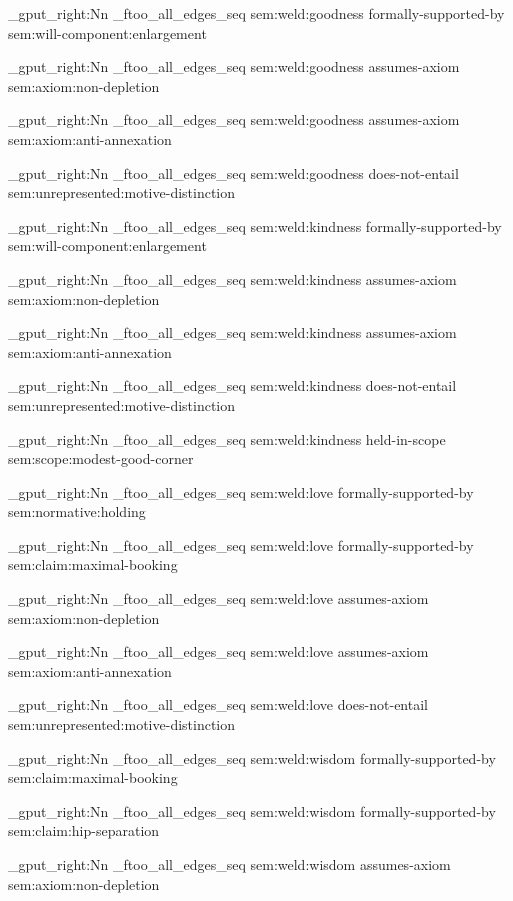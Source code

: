 \seq_gput_right:Nn \g_ftoo_all_edges_seq { { sem:weld:goodness } { formally-supported-by } { sem:will-component:enlargement } }

\seq_gput_right:Nn \g_ftoo_all_edges_seq { { sem:weld:goodness } { assumes-axiom } { sem:axiom:non-depletion } }

\seq_gput_right:Nn \g_ftoo_all_edges_seq { { sem:weld:goodness } { assumes-axiom } { sem:axiom:anti-annexation } }

\seq_gput_right:Nn \g_ftoo_all_edges_seq { { sem:weld:goodness } { does-not-entail } { sem:unrepresented:motive-distinction } }

\seq_gput_right:Nn \g_ftoo_all_edges_seq { { sem:weld:kindness } { formally-supported-by } { sem:will-component:enlargement } }

\seq_gput_right:Nn \g_ftoo_all_edges_seq { { sem:weld:kindness } { assumes-axiom } { sem:axiom:non-depletion } }

\seq_gput_right:Nn \g_ftoo_all_edges_seq { { sem:weld:kindness } { assumes-axiom } { sem:axiom:anti-annexation } }

\seq_gput_right:Nn \g_ftoo_all_edges_seq { { sem:weld:kindness } { does-not-entail } { sem:unrepresented:motive-distinction } }

\seq_gput_right:Nn \g_ftoo_all_edges_seq { { sem:weld:kindness } { held-in-scope } { sem:scope:modest-good-corner } }

\seq_gput_right:Nn \g_ftoo_all_edges_seq { { sem:weld:love } { formally-supported-by } { sem:normative:holding } }

\seq_gput_right:Nn \g_ftoo_all_edges_seq { { sem:weld:love } { formally-supported-by } { sem:claim:maximal-booking } }

\seq_gput_right:Nn \g_ftoo_all_edges_seq { { sem:weld:love } { assumes-axiom } { sem:axiom:non-depletion } }

\seq_gput_right:Nn \g_ftoo_all_edges_seq { { sem:weld:love } { assumes-axiom } { sem:axiom:anti-annexation } }

\seq_gput_right:Nn \g_ftoo_all_edges_seq { { sem:weld:love } { does-not-entail } { sem:unrepresented:motive-distinction } }

\seq_gput_right:Nn \g_ftoo_all_edges_seq { { sem:weld:wisdom } { formally-supported-by } { sem:claim:maximal-booking } }

\seq_gput_right:Nn \g_ftoo_all_edges_seq { { sem:weld:wisdom } { formally-supported-by } { sem:claim:hip-separation } }

\seq_gput_right:Nn \g_ftoo_all_edges_seq { { sem:weld:wisdom } { assumes-axiom } { sem:axiom:non-depletion } }

